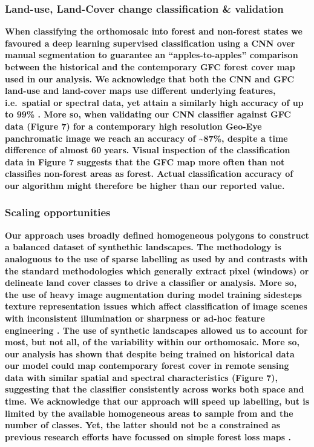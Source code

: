 \documentclass[remote sensing,article,submit,moreauthors,pdftex]{mdpi}
\begin{document}
\hypertarget{land-use-land-cover-change-classification-validation}{%
\subsubsection{Land-use, Land-Cover change classification \&
validation}\label{land-use-land-cover-change-classification-validation}}

\textbf{When classifying the orthomosaic into forest and non-forest
states we favoured a deep learning supervised classification using a CNN
over manual segmentation to guarantee an ``apples-to-apples'' comparison
between the historical and the contemporary GFC forest cover map used in
our analysis. We acknowledge that both the CNN and GFC land-use and
land-cover maps use different underlying features, i.e.~spatial or
spectral data, yet attain a similarly high accuracy of up to 99\%
\citep{hansen2013}. More so, when validating our CNN classifier against
GFC data (Figure 7) for a contemporary high resolution Geo-Eye
panchromatic image we reach an accuracy of \textasciitilde{}87\%,
despite a time difference of almost 60 years. Visual inspection of the
classification data in Figure 7 suggests that the GFC map more often
than not classifies non-forest areas as forest. Actual classification
accuracy of our algorithm might therefore be higher than our reported
value.}

\hypertarget{scaling-opportunities}{%
\subsubsection{Scaling opportunities}\label{scaling-opportunities}}

\textbf{Our approach uses broadly defined homogeneous polygons to
construct a balanced dataset of synthethic landscapes. The methodology
is analoguous to the use of sparse labelling as used by
\citep{buscombe2018} and contrasts with the standard methodologies which
generally extract pixel (windows) \citep{song2015} or delineate land
cover classes \citep{nita2018} to drive a classifier or analysis. More
so, the use of heavy image augmentation during model training sidesteps
texture representation issues which affect classification of image
scenes with inconsistent illumination or sharpness \citep{hudak1998} or
ad-hoc feature engineering \citep{song2015}. The use of synthetic
landscapes allowed us to account for most, but not all, of the
variability within our orthomosaic. More so, our analysis has shown that
despite being trained on historical data our model could map
contemporary forest cover in remote sensing data with similar spatial
and spectral characteristics (Figure 7), suggesting that the classifier
consistently across works both space and time. We acknowledge that our
approach will speed up labelling, but is limited by the available
homogeneous areas to sample from and the number of classes. Yet, the
latter should not be a constrained as previous research efforts have
focussed on simple forest loss maps \citep{hansen2013}.}
\end{document}
